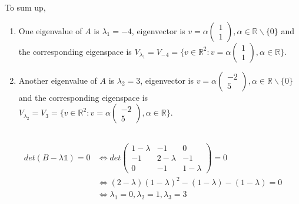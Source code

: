 \documentclass[a4paper,12pt,titlepage]{article}
\begin{document}
To sum up,
\begin{enumerate}
\item One eigenvalue of $A$ is $\lambda_1=-4$, eigenvector is $v = \alpha\begin{pmatrix}
1\\1\end{pmatrix},\alpha \in \mathbb{R} \backslash \lbrace0\rbrace$ and the corresponding eigenspace is
$V_{\lambda_1}=V_{-4}=\lbrace v\in\mathbb{R}^2:v=\alpha\begin{pmatrix}
1\\1\end{pmatrix} ,\alpha \in \mathbb{R} \rbrace$.

\item Another eigenvalue of $A$ is $\lambda_2=3$, eigenvector is $v = \alpha\begin{pmatrix}
-2\\5\end{pmatrix},\alpha \in \mathbb{R} \backslash \lbrace0\rbrace$ and the corresponding eigenspace is
$V_{\lambda_2}=V_{3}=\lbrace v\in\mathbb{R}^2:v=\alpha\begin{pmatrix}
-2\\5\end{pmatrix} ,\alpha \in \mathbb{R} \rbrace$.
\end{enumerate}

\subsection{}
\begin{align*}
det(B-\lambda\mathds{1})=0&\Leftrightarrow det\begin{pmatrix}
1-\lambda&-1&0\\-1&2-\lambda&-1\\0&-1&1-\lambda\end{pmatrix}=0\\
&\Leftrightarrow (2-\lambda)(1-\lambda)^2-(1-\lambda)-(1-\lambda)=0\\
&\Leftrightarrow\lambda_1=0,\lambda_2=1,\lambda_3=3
\end{align*}
\end{document}
